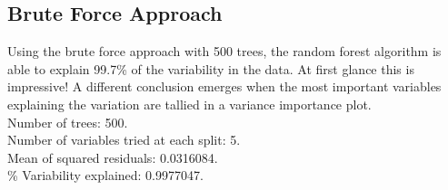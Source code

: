 \documentclass{article}\usepackage[]{graphicx}\usepackage[]{color}
\begin{document}
\subsection*{Brute Force Approach}

Using the brute force approach with 500 trees, the random forest algorithm is able to explain 99.7\% of the variability in the data. At first glance this is impressive! A different conclusion emerges when the most important variables explaining the variation are tallied in a variance importance plot.\\


Number of trees: 500.\\

Number of variables tried at each split: 5.\\

Mean of squared residuals: 0.0316084. \\

\% Variability explained:  0.9977047.\\
\end{document}
